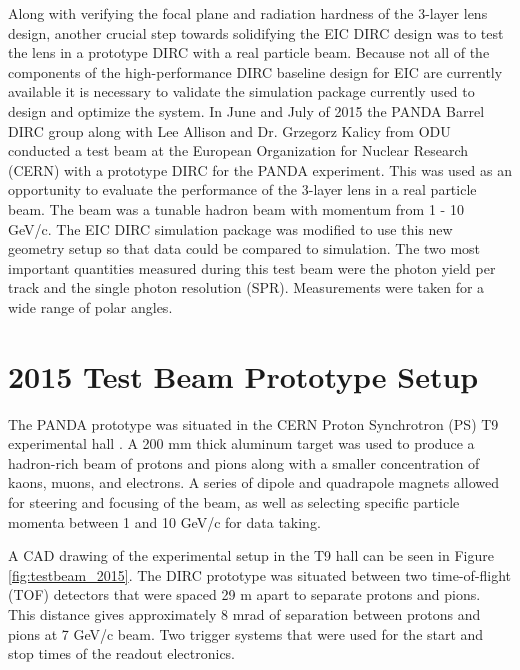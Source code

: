 \label{ch:analysis}

Along with verifying the focal plane and radiation hardness of the 3-layer lens design, another crucial step towards solidifying the EIC DIRC design was to test the lens in a prototype DIRC with a real particle beam. Because not all of the components of the high-performance DIRC baseline design for EIC are currently available it is necessary to validate the simulation package currently used to design and optimize the system. In June and July of 2015 the PANDA Barrel DIRC group along with Lee Allison and Dr. Grzegorz Kalicy from ODU conducted a test beam at the European Organization for Nuclear Research (CERN) with a prototype DIRC for the PANDA experiment. This was used as an opportunity to evaluate the performance of the 3-layer lens in a real particle beam. The beam was a tunable hadron beam with momentum from 1 - 10 GeV/c. The EIC DIRC simulation package was modified to use this new geometry setup so that data could be compared to simulation. The two most important quantities measured during this test beam were the photon yield per track and the single photon resolution (SPR). Measurements were taken for a wide range of polar angles. 

\section{2015 Test Beam Prototype Setup}
The PANDA prototype was situated in the CERN Proton Synchrotron (PS) T9 experimental hall \cite{CERN_T9}. A 200 mm thick aluminum target was used to produce a hadron-rich beam of protons and pions along with a smaller concentration of kaons, muons, and electrons. A series of dipole and quadrapole magnets allowed for steering and focusing of the beam, as well as selecting specific particle momenta between 1 and 10 GeV/c for data taking.

A CAD drawing of the experimental setup in the T9 hall can be seen in Figure \ref{fig:testbeam_2015}. The DIRC prototype was situated between two time-of-flight (TOF) detectors that were spaced 29 m apart to separate protons and pions. This distance gives approximately 8 mrad of separation between protons and pions at 7 GeV/c beam. Two trigger systems that were used for the start and stop times of the readout electronics.

